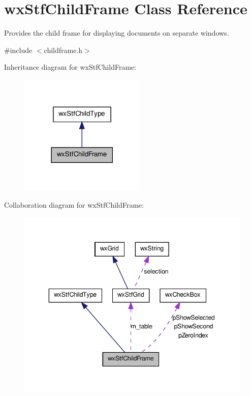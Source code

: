 \hypertarget{classwxStfChildFrame}{
\section{wxStfChildFrame Class Reference}
\label{classwxStfChildFrame}
}


Provides the child frame for displaying documents on separate windows.  




{\ttfamily \#include $<$childframe.h$>$}



Inheritance diagram for wxStfChildFrame:
\nopagebreak
\begin{figure}[H]
\begin{center}
\leavevmode
\includegraphics[width=170pt]{classwxStfChildFrame__inherit__graph}
\end{center}
\end{figure}


Collaboration diagram for wxStfChildFrame:
\nopagebreak
\begin{figure}[H]
\begin{center}
\leavevmode
\includegraphics[width=346pt]{classwxStfChildFrame__coll__graph}
\end{center}
\end{figure}
